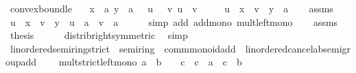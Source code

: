 \begin{isabellebody}
\isanewline
\isanewline
{}\isamarkupfalse%
\ convex{\isacharunderscore}{\kern0pt}bound{\isacharunderscore}{\kern0pt}le{\isacharcolon}{\kern0pt}\isanewline
\ \ \ {\isachardoublequoteopen}x\ {\isasymle}\ a{\isachardoublequoteclose}\ {\isachardoublequoteopen}y\ {\isasymle}\ a{\isachardoublequoteclose}\ {\isachardoublequoteopen}{}\ {\isasymle}\ u{\isachardoublequoteclose}\ {\isachardoublequoteopen}{}\ {\isasymle}\ v{\isachardoublequoteclose}\ {\isachardoublequoteopen}u\ {\isacharplus}{\kern0pt}\ v\ {\isacharequal}{\kern0pt}\ {}{\isachardoublequoteclose}\isanewline
\ \ \ {\isachardoublequoteopen}u\ {\isacharasterisk}{\kern0pt}\ x\ {\isacharplus}{\kern0pt}\ v\ {\isacharasterisk}{\kern0pt}\ y\ {\isasymle}\ a{\isachardoublequoteclose}\isanewline
%
\isadelimproof
%
\endisadelimproof
%
\isatagproof
{}\isamarkupfalse%
{\isacharminus}{\kern0pt}\isanewline
\ \ \isamarkupfalse%
\ assms\ \isamarkupfalse%
\ {\isachardoublequoteopen}u\ {\isacharasterisk}{\kern0pt}\ x\ {\isacharplus}{\kern0pt}\ v\ {\isacharasterisk}{\kern0pt}\ y\ {\isasymle}\ u\ {\isacharasterisk}{\kern0pt}\ a\ {\isacharplus}{\kern0pt}\ v\ {\isacharasterisk}{\kern0pt}\ a{\isachardoublequoteclose}\isanewline
\ \ \ \ \isamarkupfalse%
\ {\isacharparenleft}{\kern0pt}simp\ add{\isacharcolon}{\kern0pt}\ add{\isacharunderscore}{\kern0pt}mono\ mult{\isacharunderscore}{\kern0pt}left{\isacharunderscore}{\kern0pt}mono{\isacharparenright}{\kern0pt}\isanewline
\ \ \isamarkupfalse%
\ assms\ \isamarkupfalse%
\ {\isacharquery}{\kern0pt}thesis\isanewline
\ \ \ \ \isamarkupfalse%
\ distrib{\isacharunderscore}{\kern0pt}right{\isacharbrackleft}{\kern0pt}symmetric{\isacharbrackright}{\kern0pt}\ \isamarkupfalse%
\ simp\isanewline
{}\isamarkupfalse%
%
\endisatagproof
{\isafoldproof}%
%
\isadelimproof
\isanewline
%
\endisadelimproof
\isanewline
{}\isamarkupfalse%
\isanewline
\isanewline
{}\isamarkupfalse%
\ linordered{\isacharunderscore}{\kern0pt}semiring{\isacharunderscore}{\kern0pt}strict\ {\isacharequal}{\kern0pt}\ semiring\ {\isacharplus}{\kern0pt}\ comm{\isacharunderscore}{\kern0pt}monoid{\isacharunderscore}{\kern0pt}add\ {\isacharplus}{\kern0pt}\ linordered{\isacharunderscore}{\kern0pt}cancel{\isacharunderscore}{\kern0pt}ab{\isacharunderscore}{\kern0pt}semigroup{\isacharunderscore}{\kern0pt}add\ {\isacharplus}{\kern0pt}\isanewline
\ \ \ mult{\isacharunderscore}{\kern0pt}strict{\isacharunderscore}{\kern0pt}left{\isacharunderscore}{\kern0pt}mono{\isacharcolon}{\kern0pt}\ {\isachardoublequoteopen}a\ {\isacharless}{\kern0pt}\ b\ {\isasymLongrightarrow}\ {}\ {\isacharless}{\kern0pt}\ c\ {\isasymLongrightarrow}\ c\ {\isacharasterisk}{\kern0pt}\ a\ {\isacharless}{\kern0pt}\ c\ {\isacharasterisk}{\kern0pt}\ b{\isachardoublequoteclose}\isanewline

\end{isabellebody}
